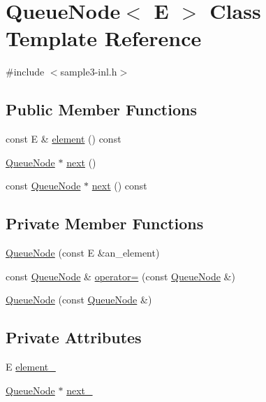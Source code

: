 \hypertarget{classQueueNode}{\section{\-Queue\-Node$<$ \-E $>$ \-Class \-Template \-Reference}
\label{d0/d98/classQueueNode}
}


{\ttfamily \#include $<$sample3-\/inl.\-h$>$}

\subsection*{\-Public \-Member \-Functions}
\begin{DoxyCompactItemize}
\item 
const \-E \& \hyperlink{classQueueNode_a9e9620b700651c08d769206393a3fbae}{element} () const 
\item 
\hyperlink{classQueueNode}{\-Queue\-Node} $\ast$ \hyperlink{classQueueNode_ae1ce1d50e8d9cff58d96c5b00d468103}{next} ()
\item 
const \hyperlink{classQueueNode}{\-Queue\-Node} $\ast$ \hyperlink{classQueueNode_a5c29fd5b378b9a1a18d05445944b80cf}{next} () const 
\end{DoxyCompactItemize}
\subsection*{\-Private \-Member \-Functions}
\begin{DoxyCompactItemize}
\item 
\hyperlink{classQueueNode_a4bdf3156732737b62d778f526eef9b2c}{\-Queue\-Node} (const \-E \&an\-\_\-element)
\item 
const \hyperlink{classQueueNode}{\-Queue\-Node} \& \hyperlink{classQueueNode_abf6fe7f60237892724842816f8c60cbc}{operator=} (const \hyperlink{classQueueNode}{\-Queue\-Node} \&)
\item 
\hyperlink{classQueueNode_a62d4b20a7713191fb1e41f80a23e00e3}{\-Queue\-Node} (const \hyperlink{classQueueNode}{\-Queue\-Node} \&)
\end{DoxyCompactItemize}
\subsection*{\-Private \-Attributes}
\begin{DoxyCompactItemize}
\item 
\-E \hyperlink{classQueueNode_aa9ac8304689080058424923fe7ecceac}{element\-\_\-}
\item 
\hyperlink{classQueueNode}{\-Queue\-Node} $\ast$ \hyperlink{classQueueNode_a98370cb174d8ae9c27a6585ffc0afb17}{next\-\_\-}
\end{DoxyCompactItemize}
